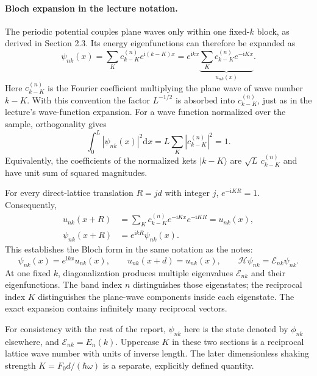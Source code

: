 \documentclass[11pt,oneside]{report}
\numberwithin{equation}{chapter}
\newcommand{\ii}{\mathrm i}
\newcommand{\dd}{\mathrm d}
\begin{document}
\paragraph{Bloch expansion in the lecture notation.}
The periodic potential couples plane waves only within one fixed-$k$ block, as derived in Section 2.3. Its energy eigenfunctions can therefore be expanded as
\begin{equation}\label{eq:pw}
 \psi_{nk}(x)=\sum_K c^{(n)}_{k-K}e^{\ii(k-K)x}
 =e^{\ii kx}\underbrace{\sum_K c^{(n)}_{k-K}e^{-\ii Kx}}_{u_{nk}(x)}.
\end{equation}
Here $c^{(n)}_{k-K}$ is the Fourier coefficient multiplying the plane wave of wave number $k-K$. With this convention the factor $L^{-1/2}$ is absorbed into $c^{(n)}_{k-K}$, just as in the lecture's wave-function expansion. For a wave function normalized over the sample, orthogonality gives
\begin{equation}
 \int_0^L|\psi_{nk}(x)|^2\dd x=L\sum_K|c^{(n)}_{k-K}|^2=1.
\end{equation}
Equivalently, the coefficients of the normalized kets $|k-K\rangle$ are $\sqrt L\,c^{(n)}_{k-K}$ and have unit sum of squared magnitudes.

For every direct-lattice translation $R=jd$ with integer $j$, $e^{-\ii KR}=1$. Consequently,
\begin{align}
 u_{nk}(x+R)&=\sum_K c^{(n)}_{k-K}e^{-\ii Kx}e^{-\ii KR}=u_{nk}(x),\\
 \psi_{nk}(x+R)&=e^{\ii kR}\psi_{nk}(x).
\end{align}
This establishes the Bloch form in the same notation as the notes:
\begin{equation}\label{eq:bloch}
 \boxed{\psi_{nk}(x)=e^{\ii kx}u_{nk}(x),\qquad u_{nk}(x+d)=u_{nk}(x),\qquad
 \mathcal H\psi_{nk}=\mathcal E_{nk}\psi_{nk}.}
\end{equation}
At one fixed $k$, diagonalization produces multiple eigenvalues $\mathcal E_{nk}$ and their eigenfunctions. The band index $n$ distinguishes those eigenstates; the reciprocal index $K$ distinguishes the plane-wave components inside each eigenstate. The exact expansion contains infinitely many reciprocal vectors.

For consistency with the rest of the report, $\psi_{nk}$ here is the state denoted by $\phi_{nk}$ elsewhere, and $\mathcal E_{nk}=E_n(k)$. Uppercase $K$ in these two sections is a reciprocal lattice wave number with units of inverse length. The later dimensionless shaking strength $K=F_0d/(\hbar\omega)$ is a separate, explicitly defined quantity.
\end{document}

